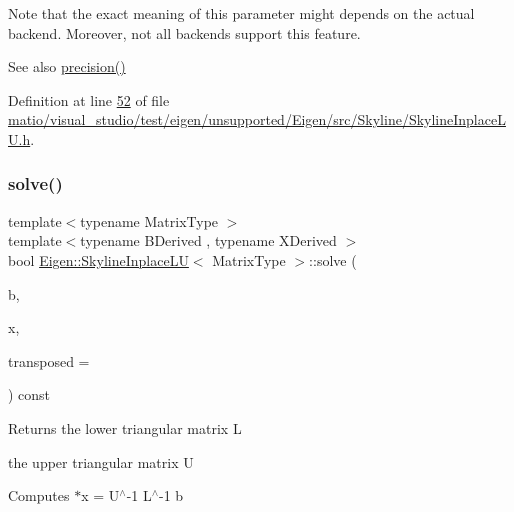 Note that the exact meaning of this parameter might depends on the actual backend. Moreover, not all backends support this feature.

\begin{DoxySeeAlso}{See also}
\hyperlink{class_eigen_1_1_skyline_inplace_l_u_a050bcbe008f2ddeea4f6d5872e0daca5}{precision()} 
\end{DoxySeeAlso}


Definition at line \hyperlink{matio_2visual__studio_2test_2eigen_2unsupported_2_eigen_2src_2_skyline_2_skyline_inplace_l_u_8h_source_l00052}{52} of file \hyperlink{matio_2visual__studio_2test_2eigen_2unsupported_2_eigen_2src_2_skyline_2_skyline_inplace_l_u_8h_source}{matio/visual\+\_\+studio/test/eigen/unsupported/\+Eigen/src/\+Skyline/\+Skyline\+Inplace\+L\+U.\+h}.

\mbox{\label{class_eigen_1_1_skyline_inplace_l_u_a53c846d76559221d2bcf336a2da4d68f}} 
\subsubsection{\texorpdfstring{solve()}{solve()}\hspace{0.1cm}{\footnotesize\ttfamily [1/2]}}
{\footnotesize\ttfamily template$<$typename Matrix\+Type $>$ \\
template$<$typename B\+Derived , typename X\+Derived $>$ \\
bool \hyperlink{class_eigen_1_1_skyline_inplace_l_u}{Eigen\+::\+Skyline\+Inplace\+LU}$<$ Matrix\+Type $>$\+::solve (\begin{DoxyParamCaption}\item[{const \hyperlink{group___core___module_class_eigen_1_1_matrix_base}{Matrix\+Base}$<$ B\+Derived $>$ \&}]{b,  }\item[{\hyperlink{group___core___module_class_eigen_1_1_matrix_base}{Matrix\+Base}$<$ X\+Derived $>$ $\ast$}]{x,  }\item[{const int}]{transposed = {} }\end{DoxyParamCaption}) const}

\begin{DoxyReturn}{Returns}
the lower triangular matrix L 

the upper triangular matrix U
\end{DoxyReturn}
Computes $\ast$x = U$^\wedge$-\/1 L$^\wedge$-\/1 b

